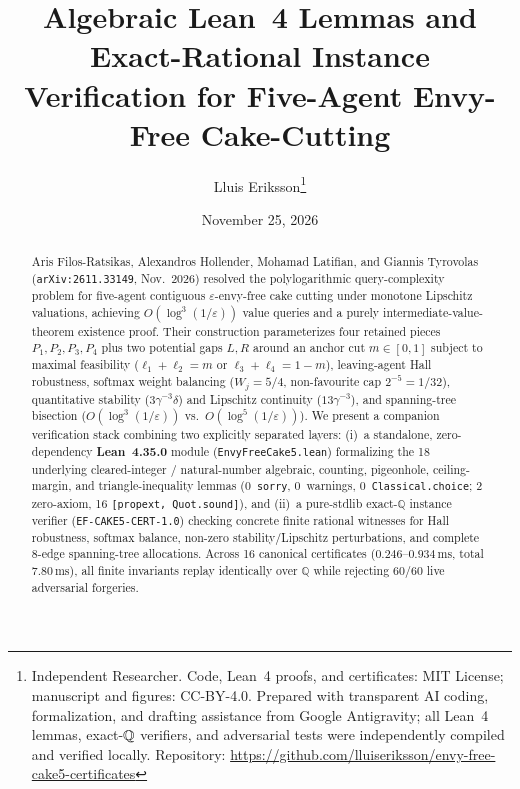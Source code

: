 \documentclass[10pt,twocolumn]{article}
\title{\vspace{-1.0em}\textbf{Algebraic Lean~4 Lemmas and Exact-Rational Instance Verification for Five-Agent Envy-Free Cake-Cutting}}
\author{Lluis Eriksson\thanks{Independent Researcher. Code, Lean~4 proofs, and certificates: MIT License; manuscript and figures: CC-BY-4.0. Prepared with transparent AI coding, formalization, and drafting assistance from Google Antigravity; all Lean~4 lemmas, exact-$\QQ$ verifiers, and adversarial tests were independently compiled and verified locally. Repository: \url{https://github.com/lluiseriksson/envy-free-cake5-certificates}}}
\date{November 25, 2026}
\newcommand{\QQ}{\mathbb{Q}}
\begin{document}
\maketitle
\vspace{-1.3em}

\begin{abstract}
Aris Filos-Ratsikas, Alexandros Hollender, Mohamad Latifian, and Giannis Tyrovolas (\texttt{arXiv:2611.33149}, Nov.\ 2026) resolved the polylogarithmic query-complexity problem for five-agent contiguous $\varepsilon$-envy-free cake cutting under monotone Lipschitz valuations, achieving $O(\log^3(1/\varepsilon))$ value queries and a purely intermediate-value-theorem existence proof. Their construction parameterizes four retained pieces $P_1, P_2, P_3, P_4$ plus two potential gaps $L, R$ around an anchor cut $m \in [0, 1]$ subject to maximal feasibility ($\ell_1 + \ell_2 = m$ or $\ell_3 + \ell_4 = 1 - m$), leaving-agent Hall robustness, softmax weight balancing ($W_j = 5/4$, non-favourite cap $2^{-5} = 1/32$), quantitative stability ($3\gamma^{-3}\delta$) and Lipschitz continuity ($13\gamma^{-3}$), and spanning-tree bisection ($O(\log^3(1/\varepsilon))$ vs.\ $O(\log^5(1/\varepsilon))$). We present a companion verification stack combining two explicitly separated layers: (i)~a standalone, zero-dependency \textbf{Lean~4.35.0} module (\texttt{EnvyFreeCake5.lean}) formalizing the 18 underlying cleared-integer / natural-number algebraic, counting, pigeonhole, ceiling-margin, and triangle-inequality lemmas (0~\texttt{sorry}, 0~warnings, 0~\texttt{Classical.choice}; 2 zero-axiom, 16 \texttt{[propext, Quot.sound]}), and (ii)~a pure-stdlib exact-$\QQ$ instance verifier (\texttt{EF-CAKE5-CERT-1.0}) checking concrete finite rational witnesses for Hall robustness, softmax balance, non-zero stability/Lipschitz perturbations, and complete 8-edge spanning-tree allocations. Across 16 canonical certificates ($0.246$--$0.934\,\mathrm{ms}$, total $7.80\,\mathrm{ms}$), all finite invariants replay identically over $\QQ$ while rejecting 60/60 live adversarial forgeries.
\end{abstract}
\end{document}
